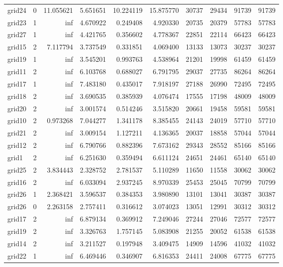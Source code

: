 \begin{longtable}{|l|r|r|r|r|r|r|r|r|r|}
grid24 & 0 & 11.055621 & 5.651651 & 10.224119 & 15.875770 & 30737 & 29434 & 91739 & 91739 \\
grid23 & 1 & inf & 4.670922 & 0.249408 & 4.920330 & 20735 & 20379 & 57783 & 57783 \\
grid27 & 1 & inf & 4.421765 & 0.356602 & 4.778367 & 22851 & 22114 & 66423 & 66423 \\
grid15 & 2 & 7.117794 & 3.737549 & 0.331851 & 4.069400 & 13133 & 13073 & 30237 & 30237 \\
grid19 & 1 & inf & 3.545201 & 0.993763 & 4.538964 & 21201 & 19998 & 61459 & 61459 \\
grid11 & 2 & inf & 6.103768 & 0.688027 & 6.791795 & 29037 & 27735 & 86264 & 86264 \\
grid17 & 1 & inf & 7.483180 & 0.435017 & 7.918197 & 27188 & 26990 & 72495 & 72495 \\
grid18 & 2 & inf & 3.690535 & 0.385939 & 4.076474 & 17555 & 17198 & 48009 & 48009 \\
grid20 & 2 & inf & 3.001574 & 0.514246 & 3.515820 & 20661 & 19458 & 59581 & 59581 \\
grid10 & 2 & 0.973268 & 7.044277 & 1.341178 & 8.385455 & 24143 & 24019 & 57710 & 57710 \\
grid21 & 2 & inf & 3.009154 & 1.127211 & 4.136365 & 20037 & 18858 & 57044 & 57044 \\
grid12 & 2 & inf & 6.790766 & 0.882396 & 7.673162 & 29343 & 28552 & 85166 & 85166 \\
grid1 & 2 & inf & 6.251630 & 0.359494 & 6.611124 & 24651 & 24461 & 65140 & 65140 \\
grid25 & 2 & 3.834443 & 2.328752 & 2.781537 & 5.110289 & 11650 & 11558 & 30062 & 30062 \\
grid16 & 2 & inf & 6.033094 & 2.937245 & 8.970339 & 25453 & 25045 & 70799 & 70799 \\
grid26 & 1 & 2.368421 & 3.596537 & 0.384353 & 3.980890 & 13101 & 13041 & 30387 & 30387 \\
grid26 & 0 & 2.263158 & 2.757411 & 0.316612 & 3.074023 & 13051 & 12991 & 30312 & 30312 \\
grid17 & 2 & inf & 6.879134 & 0.369912 & 7.249046 & 27244 & 27046 & 72577 & 72577 \\
grid19 & 2 & inf & 3.326763 & 1.757145 & 5.083908 & 21255 & 20052 & 61538 & 61538 \\
grid14 & 2 & inf & 3.211527 & 0.197948 & 3.409475 & 14909 & 14596 & 41032 & 41032 \\
grid22 & 1 & inf & 6.469446 & 0.346907 & 6.816353 & 24411 & 24008 & 67775 & 67775 \\

\end{longtable}
